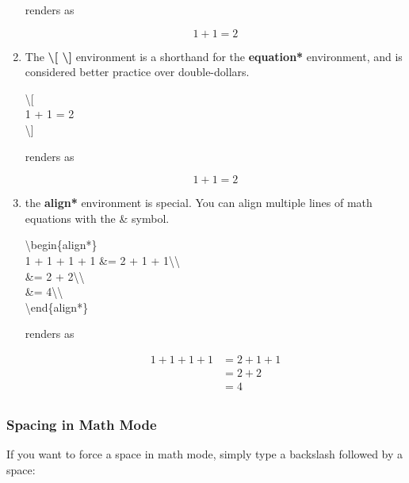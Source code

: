 \documentclass[11pt,onecolumn]{article}
\theoremstyle{definition}
\begin{document}
\begin{enumerate}
    renders as
    
    \begin{equation}
    1 + 1 = 2
    \end{equation}
    
    \item The \textbf{\textbackslash[ \textbackslash]} environment is a shorthand for the \textbf{equation*} environment, and is considered better practice over double-dollars.
    
    \begin{tcolorbox}
    \textbackslash[\\
    1 + 1 = 2\\
    \textbackslash]
    \end{tcolorbox}
    
    renders as
    
    \[
    1 + 1 = 2
    \]
    
    \item the \textbf{align*} environment is special. You can align multiple lines of math equations with the \& symbol. 
    
    \begin{tcolorbox}
    \textbackslash begin\{align*\}\\
    1 + 1 + 1 + 1 \&= 2 + 1 + 1\textbackslash\textbackslash\\
    \&= 2 + 2\textbackslash\textbackslash\\
    \&= 4\textbackslash\textbackslash\\
    \textbackslash end\{align*\}\\
    \end{tcolorbox}
    
    renders as
    
    \begin{align*}
        1 + 1 + 1 + 1 &= 2 + 1 + 1\\
        &= 2 + 2\\
        &= 4\\
    \end{align*}
    
\end{enumerate}

\subsubsection{Spacing in Math Mode}

If you want to force a space in math mode, simply type a backslash followed by a space:
    
\end{document}
